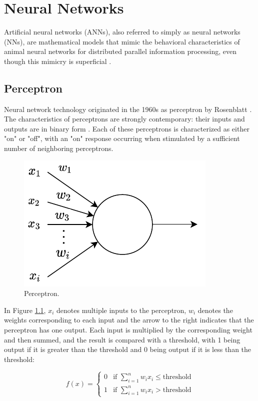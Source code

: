 \documentclass[
	parskip, 			   %
	twoside, 			   %
	DIV=14, 			   %
	BCOR=15.0mm, 		   %
	headsepline, 		   %
	open=right, 		   %
	captions=tableheading, %
	bibliography=totoc,    %
	numbers=noenddot       %
]{scrreprt}
\begin{document}
\clearpage
\chapter{Neural Networks}
\label{ch:chapter4}
Artificial neural networks (ANNs), also referred to simply as neural networks (NNs), are mathematical models that mimic the behavioral characteristics of animal neural networks for distributed parallel information processing, even though this mimicry is superficial \cite{russell2010artificial}.

\section{Perceptron}
Neural network technology originated in the 1960s as perceptron by Rosenblatt \cite{rosenblatt1958perceptron}. The characteristics of perceptrons are strongly contemporary: their inputs and outputs are in binary form \cite{mcculloch1943logical}. Each of these perceptrons is characterized as either "on" or "off", with an "on" response occurring when stimulated by a sufficient number of neighboring perceptrons.

\begin{figure}[h!]
    \centering
    \includegraphics[scale=1]{figures/perceptron.pdf}
    \caption{Perceptron.}
    \label{fig:perceptron}
\end{figure}

In Figure \ref{fig:perceptron}, $x_i$ denotes multiple inputs to the perceptron, $w_i$ denotes the weights corresponding to each input and the arrow to the right indicates that the perceptron has one output. Each input is multiplied by the corresponding weight and then summed, and the result is compared with a threshold, with 1 being output if it is greater than the threshold and 0 being output if it is less than the threshold:

\begin{equation}
    \label{eq:perceptron_1}
    f(x)=\begin{cases}0 & \text{if } \sum\nolimits_{i=1}^n w_{i} x_{i} \leq \text{threshold} \\ 1 & \text{if } \sum\nolimits_{i=1}^n w_{i} x_{i}>\text{threshold}\end{cases}
\end{equation}
\end{document}
